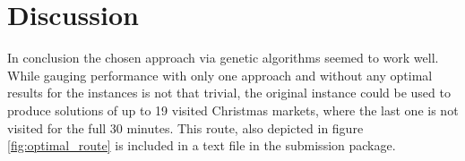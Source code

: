 \documentclass[10pt]{scrartcl}
\begin{document}


\section{Discussion}

In conclusion the chosen approach via genetic algorithms seemed to work well.
While gauging performance with only one approach and without any optimal results for the instances is not that trivial, the original instance could be used to produce solutions of up to 19 visited Christmas markets, where the last one is not visited for the full 30 minutes.
This route, also depicted in figure \ref{fig:optimal_route} is included in a text file in the submission package.
\end{document}
